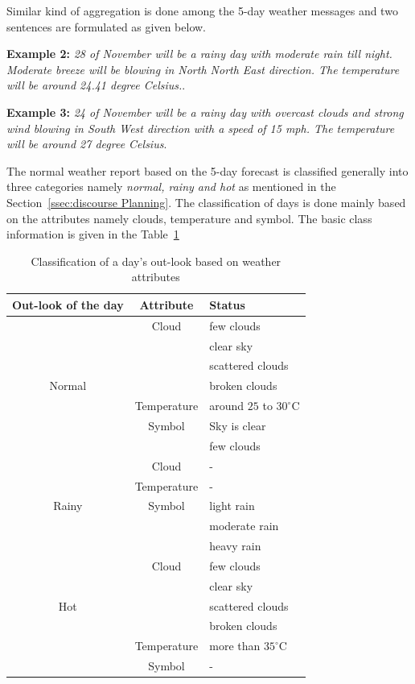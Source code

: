 \documentclass{article}
\begin{document}
Similar kind of aggregation is done among the 5-day weather messages and two sentences are formulated as given below.

{\textbf{Example 2:} \textit{28 of November will be a rainy day with moderate rain till night. Moderate breeze will be blowing in North North East direction. The temperature will be around 24.41 degree Celsius.}}.

{\textbf{Example 3:} \textit{24 of November will be a rainy day with overcast clouds and strong wind blowing in South West direction with a speed of 15 mph. The temperature will be around 27 degree Celsius}}.

The normal weather report based on the 5-day forecast is classified generally into three categories namely {\it normal, rainy and hot }as mentioned in the Section~\ref{ssec:discourse Planning}. The classification of days is done mainly based on the attributes namely clouds, temperature and symbol. 
The basic class information is given in the Table~\ref{tab:weatherClass}
\begin{table}[h!tb]
\centering
\begin{tabular}{|c|c|l|}
\hline 
Out-look of the day & Attribute & Status \\ \hline
\multirow{7}{*}{Normal} & Cloud & few clouds \\ 
 			& 			& clear sky \\ 
 			& 			& scattered clouds\\
 			& 			& broken clouds \\ \cline{2-3}
 			& Temperature & around $25$ to $30^{\circ}$C \\ \cline{2-3}
 			& Symbol & Sky is clear \\
 			& 				& few clouds \\ \hline
\multirow{5}{*}{Rainy}  & Cloud & -  \\  \cline{2-3}
		  & Temperature & - \\ \cline{2-3} 
		  & Symbol & light rain \\
		  & 			  & moderate rain  \\ 
		  & 			  & heavy rain \\ \hline
\multirow{5}{*}{Hot}  & Cloud & few clouds \\ 
 			& 			& clear sky \\ 
 			& 			& scattered clouds\\
 			& 			& broken clouds \\ \cline{2-3}
		  & Temperature &  more than $35^{\circ}$C\\ \cline{2-3} 
		  & Symbol & - \\ \hline
\end{tabular}
\vspace{3mm}
\caption{Classification of a day's out-look based on weather attributes}
\label{tab:weatherClass}
\end{table}
\end{document}
